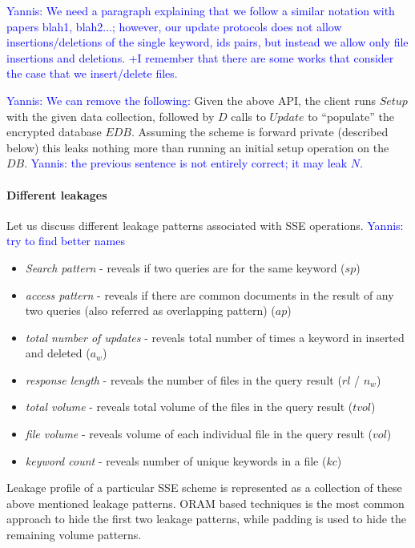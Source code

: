 \documentclass[sigconf]{acmart}
\newcommand{\yannis}[1]{\textcolor{blue}{Yannis: #1}}
\begin{document}
\yannis{We need a paragraph explaining that we follow a similar notation with papers blah1, blah2...; however, our update protocols does not allow insertions/deletions of the single keyword, ids pairs, but instead we allow only file insertions and deletions. +I remember that there are some works that consider the case that we insert/delete files.}

\yannis{We can remove the following:}
Given the above API, the client runs $Setup$ with the given data collection, followed by $D$ calls to $Update$ to “populate” the encrypted database $EDB$. Assuming the scheme is forward private (described below) this leaks nothing more than running an initial setup operation on the $DB$. \yannis{the previous sentence is not entirely correct; it may leak $N$.}
\paragraph{Different leakages} Let us discuss different leakage patterns associated with SSE operations. \yannis{try to find better names}
\begin{itemize}
    \item []\emph{Search pattern} - reveals if two queries are for the same keyword ($sp$)
    \item[] \emph{access pattern} - reveals if there are common documents in the result of any two queries (also referred as overlapping pattern) ($ap$)
      \item [] \emph{total number of updates} - reveals total number of times a keyword in inserted and deleted ($a_w$)
    \item [] \emph{response length} - reveals the number of files in the query result ($rl$ / $n_w$)
    \item [] \emph{total volume} - reveals total volume of the files in the query result ($tvol$)
     \item[] \emph{file volume} - reveals volume of each individual file in the query result ($vol$)
     \item[] \emph{keyword count} - reveals number of unique keywords in a file ($kc$)
\end{itemize}
Leakage profile of a particular SSE scheme is represented as a collection of these above mentioned leakage patterns. ORAM based techniques is the most common approach to hide the first two leakage patterns, while padding is used to hide the remaining volume patterns.
\end{document}
